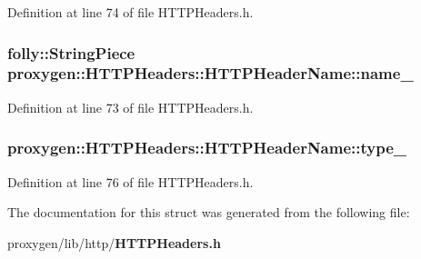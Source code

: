 Definition at line 74 of file H\+T\+T\+P\+Headers.\+h.

\subsubsection[{name\+\_\+}]{\setlength{\rightskip}{0pt plus 5cm}folly\+::\+String\+Piece proxygen\+::\+H\+T\+T\+P\+Headers\+::\+H\+T\+T\+P\+Header\+Name\+::name\+\_\+}\label{structproxygen_1_1HTTPHeaders_1_1HTTPHeaderName_a304048ffca77c06a79154fc08efb32cb}


Definition at line 73 of file H\+T\+T\+P\+Headers.\+h.

\subsubsection[{type\+\_\+}]{ proxygen\+::\+H\+T\+T\+P\+Headers\+::\+H\+T\+T\+P\+Header\+Name\+::type\+\_\+}\label{structproxygen_1_1HTTPHeaders_1_1HTTPHeaderName_a66163dbd4597ab3f6a0fb00406a98a13}


Definition at line 76 of file H\+T\+T\+P\+Headers.\+h.



The documentation for this struct was generated from the following file\+:\begin{DoxyCompactItemize}
\item 
proxygen/lib/http/{\bf H\+T\+T\+P\+Headers.\+h}\end{DoxyCompactItemize}
